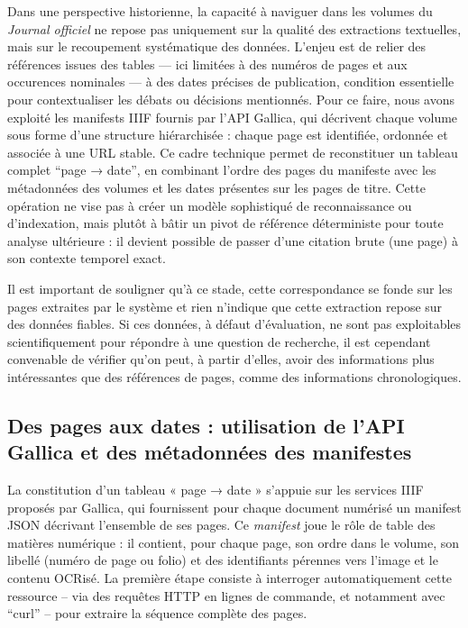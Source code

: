 Dans une perspective historienne, la capacité à naviguer dans les volumes du \emph{Journal officiel} ne repose pas uniquement sur la qualité des extractions textuelles, mais sur le recoupement systématique des données. L’enjeu est de relier des références issues des tables — ici limitées à des numéros de pages et aux occurences nominales — à des dates précises de publication, condition essentielle pour contextualiser les débats ou décisions mentionnés. Pour ce faire, nous avons exploité les manifests IIIF fournis par l’API Gallica, qui décrivent chaque volume sous forme d’une structure hiérarchisée : chaque page est identifiée, ordonnée et associée à une URL stable. Ce cadre technique permet de reconstituer un tableau complet \enquote{page → date}, en combinant l’ordre des pages du manifeste avec les métadonnées des volumes et les dates présentes sur les pages de titre. Cette opération ne vise pas à créer un modèle sophistiqué de reconnaissance ou d’indexation, mais plutôt à bâtir un pivot de référence déterministe pour toute analyse ultérieure : il devient possible de passer d’une citation brute (une page) à son contexte temporel exact. 

Il est important de souligner qu'à ce stade, cette correspondance se fonde sur les pages extraites par le système et rien n'indique que cette extraction repose sur des données fiables. Si ces données, à défaut d'évaluation, ne sont pas exploitables scientifiquement pour répondre à une question de recherche, il est cependant convenable de vérifier qu'on peut, à partir d'elles, avoir des informations plus intéressantes que des références de pages, comme des informations chronologiques.

\subsection{Des pages aux dates : utilisation de l'API Gallica et des métadonnées des manifestes}

La constitution d’un tableau « page → date » s’appuie sur les services IIIF proposés par Gallica, qui fournissent pour chaque document numérisé un manifest JSON décrivant l’ensemble de ses pages. Ce \emph{manifest} joue le rôle de table des matières numérique : il contient, pour chaque page, son ordre dans le volume, son libellé (numéro de page ou folio) et des identifiants pérennes vers l’image et le contenu OCRisé. La première étape consiste à interroger automatiquement cette ressource -- via des requêtes HTTP en lignes de commande, et notamment avec \enquote{curl} -- pour extraire la séquence complète des pages.

